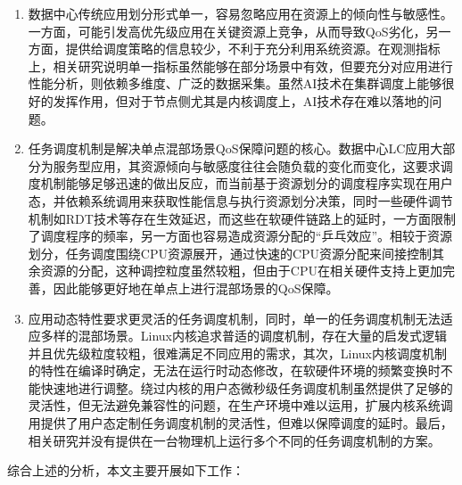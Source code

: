 \begin{enumerate}
    \item 数据中心传统应用划分形式单一，容易忽略应用在资源上的倾向性与敏感性。一方面，可能引发高优先级应用在关键资源上竞争，从而导致QoS劣化，另一方面，提供给调度策略的信息较少，不利于充分利用系统资源。在观测指标上，相关研究说明单一指标虽然能够在部分场景中有效，但要充分对应用进行性能分析，则依赖多维度、广泛的数据采集。虽然AI技术在集群调度上能够很好的发挥作用，但对于节点侧尤其是内核调度上，AI技术存在难以落地的问题。
    \item 任务调度机制是解决单点混部场景QoS保障问题的核心。数据中心LC应用大部分为服务型应用，其资源倾向与敏感度往往会随负载的变化而变化，这要求调度机制能够足够迅速的做出反应，而当前基于资源划分的调度程序实现在用户态，并依赖系统调用来获取性能信息与执行资源划分决策，同时一些硬件调节机制如RDT技术等存在生效延迟，而这些在软硬件链路上的延时，一方面限制了调度程序的频率，另一方面也容易造成资源分配的“乒乓效应”。相较于资源划分，任务调度围绕CPU资源展开，通过快速的CPU资源分配来间接控制其余资源的分配，这种调控粒度虽然较粗，但由于CPU在相关硬件支持上更加完善，因此能够更好地在单点上进行混部场景的QoS保障。
    \item 应用动态特性要求更灵活的任务调度机制，同时，单一的任务调度机制无法适应多样的混部场景。Linux内核追求普适的调度机制，存在大量的启发式逻辑并且优先级粒度较粗，很难满足不同应用的需求，其次，Linux内核调度机制的特性在编译时确定，无法在运行时动态修改，在软硬件环境的频繁变换时不能快速地进行调整。绕过内核的用户态微秒级任务调度机制虽然提供了足够的灵活性，但无法避免兼容性的问题，在生产环境中难以运用，扩展内核系统调用提供了用户态定制任务调度机制的灵活性，但难以保障调度的延时。最后，相关研究并没有提供在一台物理机上运行多个不同的任务调度机制的方案。
\end{enumerate}

综合上述的分析，本文主要开展如下工作：

